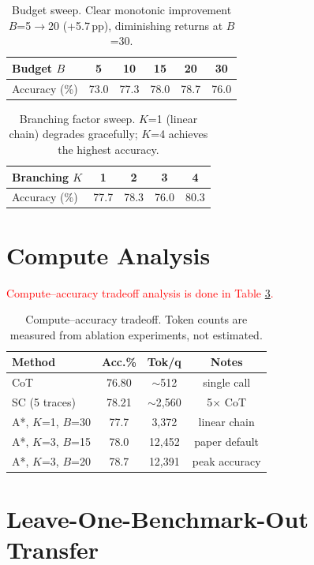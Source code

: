 \documentclass[11pt]{article}
\begin{document}
{\begin{table}[ht]
\centering
\small
\begin{tabular}{lccccc}
\toprule
\textbf{Budget $B$} & 5 & 10 & 15 & 20 & 30 \\
\midrule
Accuracy (\%) & 73.0 & 77.3 & 78.0 & 78.7 & 76.0 \\
\bottomrule
\end{tabular}
\caption{Budget sweep. Clear monotonic improvement $B$=5$\to$20 (+5.7\,pp), diminishing returns at $B$=30.}
\label{tab:sensitivity_budget}
\end{table}

\begin{table}[ht]
\centering
\small
\begin{tabular}{lcccc}
\toprule
\textbf{Branching $K$} & 1 & 2 & 3 & 4 \\
\midrule
Accuracy (\%) & 77.7 & 78.3 & 76.0 & 80.3 \\
\bottomrule
\end{tabular}
\caption{Branching factor sweep. $K$=1 (linear chain) degrades gracefully; $K$=4 achieves the highest accuracy.}
\label{tab:sensitivity_branch}
\end{table}

\section{Compute Analysis}
\label{app:compute}
\textcolor{red}{Compute--accuracy tradeoff analysis is done in Table \ref{tab:compute}.}
\begin{table}[ht]
\centering
\small
\begin{tabular}{lccc}
\toprule
\textbf{Method} & \textbf{Acc.\%} & \textbf{Tok/q} & \textbf{Notes} \\
\midrule
CoT & 76.80 & $\sim$512 & single call \\
SC (5 traces) & 78.21 & $\sim$2,560 & 5$\times$ CoT \\
A*, $K$=1, $B$=30 & 77.7 & 3,372 & linear chain \\
A*, $K$=3, $B$=15 & 78.0 & 12,452 & paper default \\
A*, $K$=3, $B$=20 & 78.7 & 12,391 & peak accuracy \\
\bottomrule
\end{tabular}
\caption{Compute--accuracy tradeoff. Token counts are measured from ablation experiments, not estimated.}
\label{tab:compute}
\end{table}

\section{Leave-One-Benchmark-Out Transfer}
\label{app:leave_one_out}

}
\end{document}
